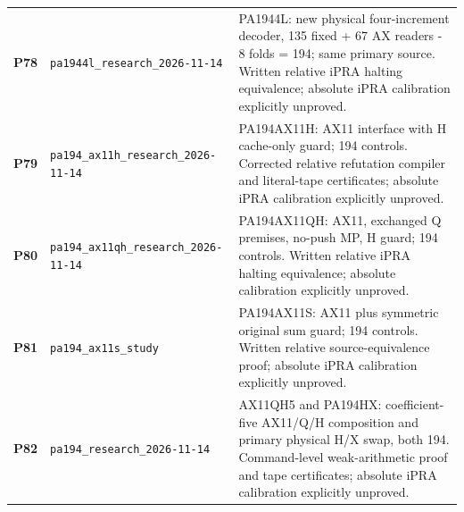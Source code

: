 \begin{longtable}{@{}>{\raggedright\arraybackslash}p{.055\linewidth}>{\raggedright\arraybackslash}p{.355\linewidth}>{\raggedright\arraybackslash}p{.55\linewidth}@{}}
\hypertarget{packet-P78}{\textbf{P78}} & \nolinkurl{pa1944l_research_2026-11-14} & PA1944L: new physical four-increment decoder, 135 fixed + 67 AX readers - 8 folds = 194; same primary source. Written relative iPRA halting equivalence; absolute iPRA calibration explicitly unproved.\\[3pt]
\hypertarget{packet-P79}{\textbf{P79}} & \nolinkurl{pa194_ax11h_research_2026-11-14} & PA194AX11H: AX11 interface with H cache-only guard; 194 controls. Corrected relative refutation compiler and literal-tape certificates; absolute iPRA calibration explicitly unproved.\\[3pt]
\hypertarget{packet-P80}{\textbf{P80}} & \nolinkurl{pa194_ax11qh_research_2026-11-14} & PA194AX11QH: AX11, exchanged Q premises, no-push MP, H guard; 194 controls. Written relative iPRA halting equivalence; absolute calibration explicitly unproved.\\[3pt]
\hypertarget{packet-P81}{\textbf{P81}} & \nolinkurl{pa194_ax11s_study} & PA194AX11S: AX11 plus symmetric original sum guard; 194 controls. Written relative source-equivalence proof; absolute iPRA calibration explicitly unproved.\\[3pt]
\hypertarget{packet-P82}{\textbf{P82}} & \nolinkurl{pa194_research_2026-11-14} & AX11QH5 and PA194HX: coefficient-five AX11/Q/H composition and primary physical H/X swap, both 194. Command-level weak-arithmetic proof and tape certificates; absolute iPRA calibration explicitly unproved.\\[3pt]
\end{longtable}
\endgroup
